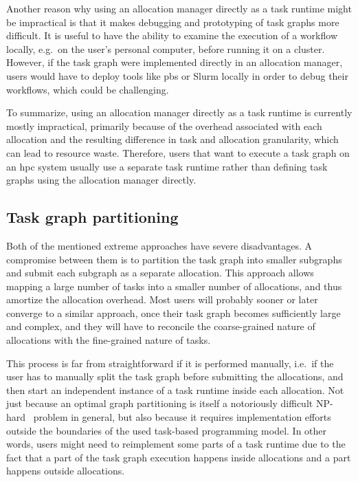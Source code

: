 Another reason why using an allocation manager directly as a task runtime might be impractical is that
it makes debugging and prototyping of task graphs more difficult. It is useful to have the ability
to examine the execution of a workflow locally, e.g.\ on the user's personal computer, before
running it on a cluster. However, if the task graph were implemented directly in an allocation
manager, users would have to deploy tools like \gls{pbs} or Slurm locally in order to debug their workflows, which
could be challenging.

To summarize, using an allocation manager directly as a task runtime is currently mostly impractical,
primarily because of the overhead associated with each allocation and the resulting difference in
task and allocation granularity, which can lead to resource waste. Therefore, users that want to execute a task graph
on an \gls{hpc} system usually use a separate task runtime rather than defining
task graphs using the allocation manager directly.

\subsection*{Task graph partitioning}
Both of the mentioned extreme approaches have severe disadvantages. A compromise between them
is to partition the task graph into smaller subgraphs and submit each subgraph as a separate allocation.
This approach allows mapping a large number of tasks into a smaller number of allocations, and thus amortize the
allocation overhead. Most users will probably sooner or later converge to a similar approach, once
their task graph becomes sufficiently large and complex, and they will have to reconcile the
coarse-grained nature of allocations with the fine-grained nature of tasks.

This process is far from straightforward if it is performed manually, i.e.\ if the user has to
manually split the task graph before submitting the allocations, and then start an independent
instance of a task runtime inside each allocation. Not just because an optimal graph partitioning
is itself a notoriously difficult NP-hard~\cite{graph_partitioning} problem in general, but also because
it requires implementation efforts outside the boundaries of the used
task-based programming model. In other words, users might need to reimplement some parts of a task runtime due to
the fact that a part of the task graph execution happens inside allocations and a part happens outside allocations.

